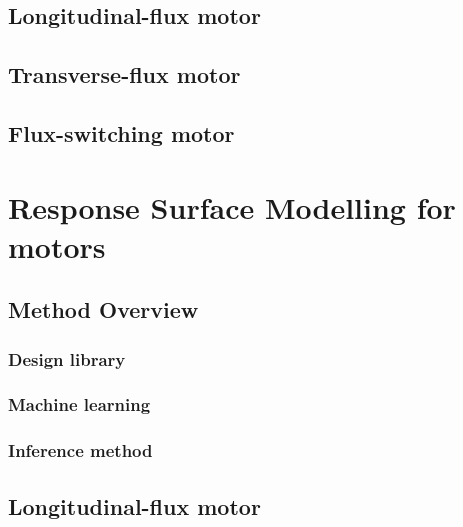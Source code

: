     \subsection{Longitudinal-flux motor}        \label{Chapter:PMLSM design RSM/electromagnetic model/longitudinal flux}
    \subsection{Transverse-flux motor}          \label{Chapter:PMLSM design RSM/electromagnetic model/transverse flux}
    \subsection{Flux-switching motor}           \label{Chapter:PMLSM design RSM/electromagnetic model/flux switching}


\section{Response Surface Modelling for motors} \label{Chapter:PMLSM design RSM/RSM for motors}
    \subsection{Method Overview}                \label{Chapter:PMLSM design RSM/RSM for motors/method overview}
        \subsubsection{Design library}          \label{Chapter:PMLSM design RSM/RSM for motors/method overview/design library}
        \subsubsection{Machine learning}        \label{Chapter:PMLSM design RSM/RSM for motors/method overview/machine learning}
        \subsubsection{Inference method}        \label{Chapter:PMLSM design RSM/RSM for motors/method overview/inference method}
    \subsection{Longitudinal-flux motor}        \label{Chapter:PMLSM design RSM/RSM for motors/longitudinal flux}
